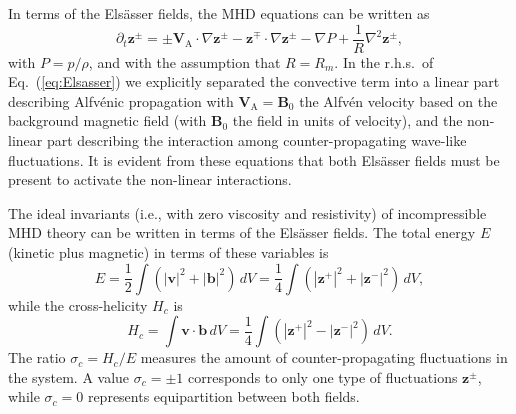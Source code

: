 \documentclass[aip,pop,reprint,amsmath,amssymb,floatfix]{revtex4-1}
\renewcommand{\vec}[1]{\mathbf{#1}}
\begin{document}
In terms of the Els\"asser fields, the MHD equations can be written
\cite{servidio_time_2011} as
\begin{equation}
\partial_t \vec{z}^\pm  = \pm  \vec{V}_\textrm{A} \cdot \nabla \vec{z}^\pm  - 
\vec{z}^\mp \cdot \nabla \vec{z}^\pm - \nabla{P} + 
\frac{1}{R} \nabla^2 \vec{z}^\pm ,
\label{eq:Elsasser}
\end{equation}
with $P=p/\rho$, and with the assumption that $R=R_m$. In the
r.h.s.~of Eq.~(\ref{eq:Elsasser}) we explicitly separated the
convective term into a linear part describing Alfv\'enic propagation
with $\vec{V}_\textrm{A} = \vec{B}_0$ the Alfv\'en velocity based on
the background magnetic field (with $\vec{B}_0$ the field in units of
velocity), and the non-linear part describing the interaction among
counter-propagating wave-like fluctuations. It is evident from these
equations that both Els\"asser fields must be present to activate the
non-linear interactions.

The ideal invariants (i.e., with zero viscosity and resistivity) of
incompressible MHD theory can be written in terms of the Els\"asser
fields. The total energy $E$ (kinetic plus magnetic) in terms of these
variables is
\begin{equation}
E = \frac{1}{2}\int{\left(\left|\vec{v}\right|^2 +
    \left|\vec{b}\right|^2 \right)\,dV} =
    \frac{1}{4}\int{\left(\left|\vec{z}^+\right|^2 +
    \left|\vec{z}^-\right|^2 \right)\,dV},
\label{eq:ener}
\end{equation}
while the cross-helicity $H_c$ is
\begin{equation}
H_c = \int{\vec{v}\cdot\vec{b} \, dV} =
    \frac{1}{4}\int{\left(\left|\vec{z}^+\right|^2 
    - \left|\vec{z}^-\right|^2 \right)\,dV} .
\label{eq:cross}
\end{equation}
The ratio $\sigma_c = H_c/E$ measures the amount of counter-propagating
fluctuations in the system. A value $\sigma_c = \pm 1$ corresponds to
only one type of fluctuations $\vec{z}^\pm$, while $\sigma_c=0$
represents equipartition between both fields.
\end{document}
